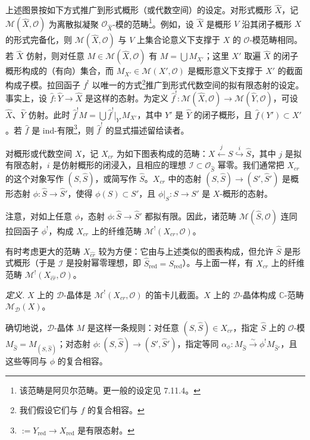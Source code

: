 上述图景按如下方式推广到形式概形（或代数空间）的设定。对形式概形 $\hat X$，记 $\mathcal{M}(\hat X,\mathcal{O})$ 为离散拟凝聚 $\mathcal{O}_{\hat X}$-模的范畴\footnote{该范畴是阿贝尔范畴。更一般的设定见 7.11.4。}。例如，设 $\hat X$ 是概形 $V$ 沿其闭子概形 $X$ 的形式完备化，则 $\mathcal{M}(\hat X,\mathcal{O})$ 与 $V$ 上集合论意义下支撑于 $X$ 的 $\mathcal{O}$-模范畴相同。若 $\hat X$ 仿射，则对任意 $M\in\mathcal{M}(\hat X,\mathcal{O})$ 有 $M=\bigcup M_{X'}$；这里 $X'$ 取遍 $\hat X$ 的闭子概形构成的（有向）集合，而 $M_{X'}\in\mathcal{M}(X',\mathcal{O})$ 是概形意义下支撑于 $X'$ 的截面构成子模。拉回函子 $f^{!}$ 以唯一的方式\footnote{我们假设它们与 $f$ 的复合相容。}推广到形式代数空间的拟有限态射的设定。事实上，设 $\hat f:\hat Y\to\hat X$ 是这样的态射。为定义 $\hat f^{!}:\mathcal{M}(\hat X,\mathcal{O})\to\mathcal{M}(\hat Y,\mathcal{O})$，可设 $\hat X$、$\hat Y$ 仿射。此时 $\hat f^{!}M=\bigcup\hat f^{!}|_{Y'}M_{X'}$，其中 $Y'$ 是 $\hat Y$ 的闭子概形，且 $\hat f(Y')\subset X'$。若 $\hat f$ 是 ind-有限\footnote{$:=Y_{\mathrm{red}}\to X_{\mathrm{red}}$ 是有限态射。}，则 $\hat f^{!}$ 的显式描述留给读者。


 对概形或代数空间 $X$，记 $X_{cr}$ 为如下图表构成的范畴：$X\overset{j}{\longleftarrow}S\overset{i}{\hookrightarrow}\hat S$，其中 $j$ 是拟有限态射，$i$ 是仿射概形的闭浸入，且相应的理想 $\mathcal{I}\subset\mathcal{O}_{\hat S}$ 幂零。我们通常把 $X_{cr}$ 的这个对象写作 $(S,\hat S)$，或简写作 $\hat S$。$X_{cr}$ 中的态射 $(S,\hat S)\to(S',\hat S')$ 是概形态射 $\phi:\hat S\to\hat S'$，使得 $\phi(S)\subset S'$，且 $\phi|_{S}:S\to S'$ 是 $X$-概形的态射。

注意，对如上任意 $\phi$，态射 $\phi:\hat S\to\hat S'$ 都拟有限。因此，诸范畴 $\mathcal{M}(\hat S,\mathcal{O})$ 连同拉回函子 $\phi^{!}$，构成 $X_{cr}$ 上的纤维范畴 $\mathcal{M}^{!}(X_{cr},\mathcal{O})$。

有时考虑更大的范畴 $X_{\widehat{cr}}$ 较为方便：它由与上述类似的图表构成，但允许 $\hat S$ 是形式概形（于是 $\mathcal{I}$ 是投射幂零理想，即 $\hat S_{\mathrm{red}}=S_{\mathrm{red}}$）。与上面一样，有 $X_{\widehat{cr}}$ 上的纤维范畴 $\mathcal{M}^{!}(X_{\widehat{cr}},\mathcal{O})$。

 \emph{定义.} $X$ 上的 $\mathcal{D}$-晶体是 $\mathcal{M}^{!}(X_{cr},\mathcal{O})$ 的笛卡儿截面。$X$ 上的 $\mathcal{D}$-晶体构成 $\mathbb{C}$-范畴 $\mathcal{M}_{\mathcal{D}}(X)$。

确切地说，$\mathcal{D}$-晶体 $M$ 是这样一条规则：对任意 $(S,\hat S)\in X_{cr}$，指定 $\hat S$ 上的 $\mathcal{O}$-模 $M_{\hat S}=M_{(S,\hat S)}$；对态射 $\phi:(S,\hat S)\to(S',\hat S')$，指定等同 $\alpha_{\phi}:M_{\hat S}\xrightarrow{\sim}\phi^{!}M_{\hat S'}$，且这些等同与 $\phi$ 的复合相容。

